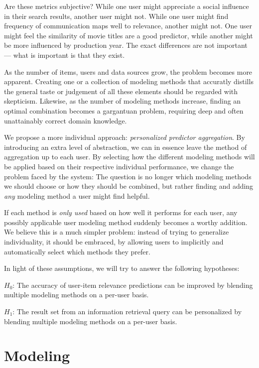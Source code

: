 Are these metrics subjective? While one user might appreciate a social
influence in their search results, another user might not.
While one user might find frequency of communication maps well to relevance,
another might not. 
One user might feel the similarity of movie titles are a good predictor,
while another might be more influenced by production year.
The exact differences are not important --- what is important is that they exist.

As the number of items, users and data sources grow, the problem becomes more apparent.
Creating one or a collection of modeling methods that accuratly distills the general
taste or judgement of all these elements should be regarded with skepticism.
Likewise, as the number of modeling methods increase, finding an optimal combination
becomes a gargantuan problem, requiring deep and often unattainably correct domain knowledge.

We propose a more individual approach: \emph{personalized predictor aggregation}.
By introducing an extra level of abstraction, we can in essence leave the method of aggregation
up to each user. By selecting how the different modeling methods will be applied based
on their respective individual performance, we change the problem faced by the system:
The question is no longer which modeling methods we should choose or how they should be combined,
but rather finding and adding \emph{any} modeling method a user might find helpful.

If each method is \emph{only used} based on how well it performs for each user,
any possibly applicable user modeling method suddenly becomes a worthy addition.
We believe this is a much simpler problem: 
instead of trying to generalize individuality,
it should be embraced, by allowing users to implicitly and automatically select which methods they prefer.

In light of these assumptions, we will try to answer the following hypotheses:

$H_{0}$: The accuracy of user-item relevance predictions can be improved
by blending multiple modeling methods on a per-user basis.

$H_{1}$: The result set from an information retrieval query
can be personalized by blending multiple modeling methods on a per-user basis.



\section{Modeling}

